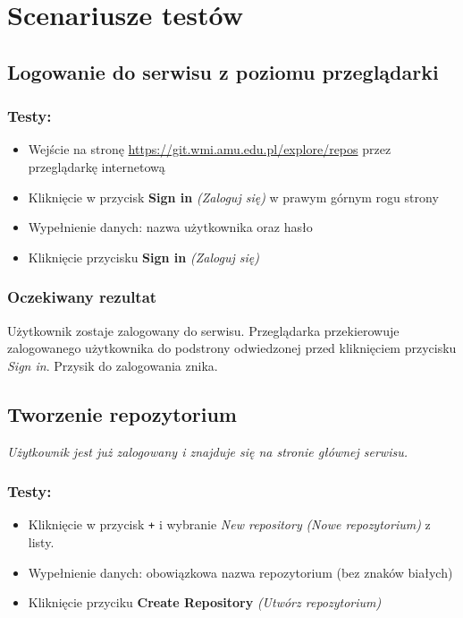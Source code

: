 \documentclass{article}
\begin{document}
\newpage
\section{Scenariusze testów}

\subsection{Logowanie do serwisu z poziomu przeglądarki}
\subsubsection*{Testy:}
\begin{itemize}
    \item Wejście na stronę \url{https://git.wmi.amu.edu.pl/explore/repos} przez przeglądarkę internetową
    \item Kliknięcie w przycisk \textbf{Sign in} \textit{(Zaloguj się)} w prawym górnym rogu strony
    \item Wypełnienie danych: nazwa użytkownika oraz hasło
    \item Kliknięcie przycisku \textbf{Sign in} \textit{(Zaloguj się)}
\end{itemize}
\subsubsection*{Oczekiwany rezultat}
Użytkownik zostaje zalogowany do serwisu. Przeglądarka przekierowuje zalogowanego użytkownika do
podstrony odwiedzonej przed kliknięciem przycisku \textit{Sign in}. Przysik do zalogowania znika.

\subsection{Tworzenie repozytorium}
\textit{Użytkownik jest już zalogowany i znajduje się na stronie głównej serwisu.}
\subsubsection*{Testy:}
\begin{itemize}
    \item Kliknięcie w przycisk \texttt{+} i wybranie \textit{New repository} \textit{(Nowe repozytorium)} z listy.
    \item Wypełnienie danych: obowiązkowa nazwa repozytorium (bez znaków białych)
    \item Kliknięcie przyciku \textbf{Create Repository} \textit{(Utwórz repozytorium)}
\end{itemize}
\end{document}
